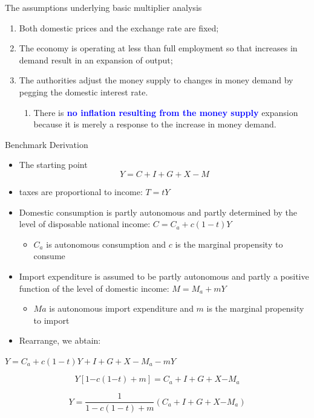\documentclass[10pt,hyperref={CJKbookmarks=true},xcolor=dvipsnames,aspectratio=169]{beamer}
\begin{document}
\begin{frame}{The assumptions underlying basic multiplier analysis}

\begin{enumerate}
\item Both domestic prices and the exchange rate are fixed; 
\item The economy is operating at less than full employment so that increases
in demand result in an expansion of output;
\item The authorities adjust the money supply to changes in money demand
by pegging the domestic interest rate. 

\begin{enumerate}
	\item There is\textbf{\textcolor{blue}{{} no inflation resulting from the
			money supply}} expansion because it is merely a response to the increase
	in money demand.
\end{enumerate}
\end{enumerate}
\end{frame}

\begin{frame}[allowframebreaks]{Benchmark Derivation}

\begin{itemize}
\item The starting point
\[
Y=C+I+G+X-M
\]

\item taxes are proportional to income: $T=tY$
\item Domestic consumption is partly autonomous and partly determined by
the level of disposable national income: $C=C_{a}+c(1-t)Y$

\begin{itemize}
\item $C_{a}$ is autonomous consumption and $c$ is the marginal propensity
to consume
\end{itemize}
\item Import expenditure is assumed to be partly autonomous and partly a
positive function of the level of domestic income: $M=M_{a}+mY$

\begin{itemize}
\item $Ma$ is autonomous import expenditure and $m$ is the marginal propensity
to import
\end{itemize}
\item Rearrange, we abtain:
\end{itemize}

\begin{center}
$Y=C_{a}+c(1-t)Y+I+G+X-M_{a}-mY$
\par\end{center}


\[
Y[1\text{−}c(1\text{−}t)+m]=C_{a}+I+G+X\text{−}M_{a}
\]


\[
Y=\frac{1}{1-c(1-t)+m}\left(C_{a}+I+G+X\text{−}M_{a}\right)
\]

\end{frame}
\end{document}
